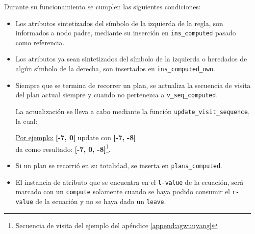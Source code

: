 Durante su funcionamiento se cumplen las siguientes condiciones:
\begin{itemize}
\item Los atributos sintetizados del símbolo de la izquierda de la regla, son informados a nodo padre, mediante su inserción en \texttt{ins\_computed} pasado como referencia.

\item Los atributos ya sean sintetizados del símbolo de la izquierda o heredados de algún símbolo de la derecha, son insertados en \texttt{ins\_computed\_own}.

\item Siempre que se termina de recorrer un plan, se actualiza la secuencia de visita del plan actual siempre y cuando no pertenezca a \texttt{v\_seq\_computed}.

La actualización se lleva a cabo mediante la función \texttt{update\_visit\_sequence}, la cual:

\underline{Por ejemplo:}\hspace*{1cm} \textbf{[-7, 0]} update con \textbf{[-7, -8]}\\
\hspace*{2.8cm} da como resultado: \textbf{[-7, 0, -8]}\footnote{Secuencia de visita del ejemplo del apéndice \ref{append:agwuuyang}}.

\item Si un plan se recorrió en su totalidad, se inserta en \texttt{plans\_computed}.

\item El instancia de atributo que se encuentra en el \texttt{l-value} de la ecuación, será marcado con un \texttt{compute} solamente cuando se haya podido consumir el \texttt{r-value} de la ecuación y no se haya dado un \texttt{leave}.


\end{itemize}
